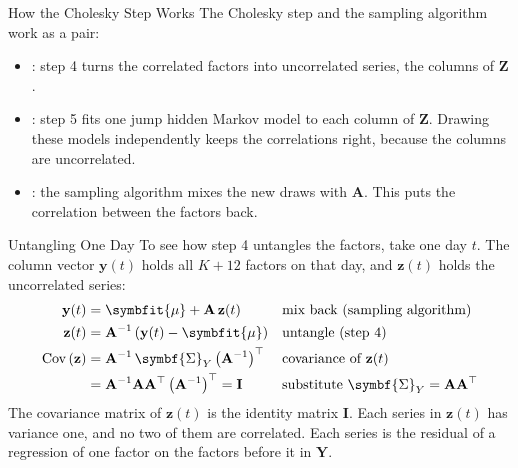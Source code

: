 \documentclass[aspectratio=169,11pt]{beamer}
\begin{document}
\begin{frame}{How the Cholesky Step Works}
  The Cholesky step and the sampling algorithm work as a pair:
  \begin{itemize}\setlength{\itemsep}{0.6em}
    \item {}: step 4 turns the correlated factors into uncorrelated series, the
      columns of $\mathbf{Z}$.
    \item {}: step 5 fits one jump hidden Markov model to each column of $\mathbf{Z}$.
      Drawing these models independently keeps the correlations right, because the columns are
      uncorrelated.
    \item {}: the sampling algorithm mixes the new draws with $\mathbf{A}$. This puts
      the correlation between the factors back.
  \end{itemize}
\end{frame}

\begin{frame}{Untangling One Day}
  To see how step 4 untangles the factors, take one day $t$. The column vector $\mathbf{y}(t)$ holds
  all $K+12$ factors on that day, and $\mathbf{z}(t)$ holds the uncorrelated series:
  \begin{align*}
    \mathbf{y}(t) &= \symbfit{\mu}+\mathbf{A}\,\mathbf{z}(t) && \text{mix back (sampling algorithm)}\\
    \mathbf{z}(t) &= \mathbf{A}^{-1}\left(\mathbf{y}(t)-\symbfit{\mu}\right) && \text{untangle (step 4)}\\
    \operatorname{Cov}\left(\mathbf{z}\right) &= \mathbf{A}^{-1}\,\symbf{\Sigma}_{Y}\left(\mathbf{A}^{-1}\right)^{\top} && \text{covariance of } \mathbf{z}(t)\\
    &= \mathbf{A}^{-1}\mathbf{A}\mathbf{A}^{\top}\left(\mathbf{A}^{-1}\right)^{\top} = \mathbf{I} && \text{substitute } \symbf{\Sigma}_{Y}=\mathbf{A}\mathbf{A}^{\top}
  \end{align*}
  The covariance matrix of $\mathbf{z}(t)$ is the identity matrix $\mathbf{I}$. Each series in
  $\mathbf{z}(t)$ has variance one, and no two of them are correlated. Each series is the residual of a
  regression of one factor on the factors before it in $\mathbf{Y}$.
\end{frame}
\end{document}
